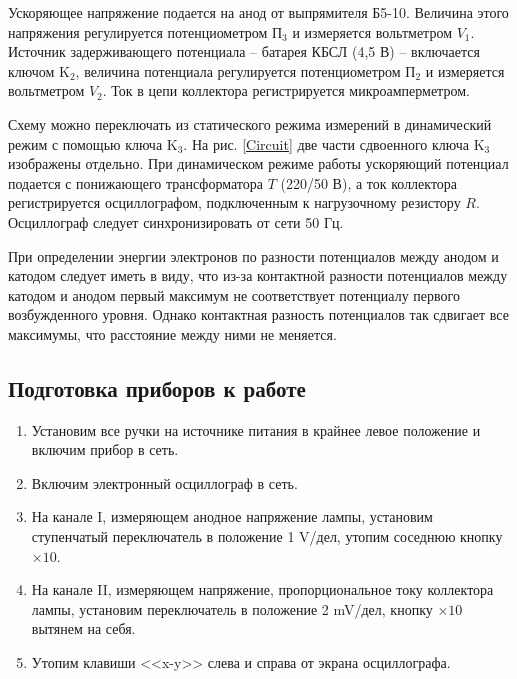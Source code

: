 	Ускоряющее напряжение подается на анод от выпрямителя Б5-10. Величина этого напряжения регулируется потенциометром П$_3$ и измеряется вольтметром $V_1$. Источник задерживающего потенциала -- батарея КБСЛ (4,5 В) -- включается ключом K$_2$, величина потенциала регулируется потенциометром П$_2$ и измеряется вольтметром $V_2$. Ток в цепи коллектора регистрируется микроамперметром.

	Схему можно переключать из статического режима измерений в динамический режим с помощью ключа K$_3$. На рис. \ref{Circuit} две части сдвоенного ключа K$_3$ изображены отдельно. При динамическом режиме работы ускоряющий потенциал подается с понижающего трансформатора $T$ (220/50 В), а ток коллектора регистрируется осциллографом, подключенным к нагрузочному резистору $R$. Осциллограф следует синхронизировать от сети 50 Гц.

	
	При определении энергии электронов по разности потенциалов между анодом и катодом следует иметь в виду, что из-за контактной разности потенциалов между катодом и анодом первый максимум не соответствует потенциалу первого возбужденного уровня. Однако контактная разность потенциалов так сдвигает все максимумы, что расстояние между ними не меняется.
	
	\newpage
	

	
	\subsection*{Подготовка приборов к работе}
	

	\begin{enumerate}
		\item Установим все ручки на источнике питания в крайнее левое положение и включим прибор в сеть.
		
		\item Включим электронный осциллограф в сеть.
		
		\item На канале I, измеряющем анодное напряжение лампы, установим ступенчатый переключатель в положение 1 V/дел, утопим соседнюю кнопку $\times 10$.
		
		\item На канале II, измеряющем напряжение, пропорциональное току коллектора лампы, установим переключатель в положение 2 mV/дел, кнопку $\times 10$ вытянем на себя.
		
		\item Утопим клавиши <<x-y>> слева и справа от экрана осциллографа.
 	\end{enumerate}
 	
